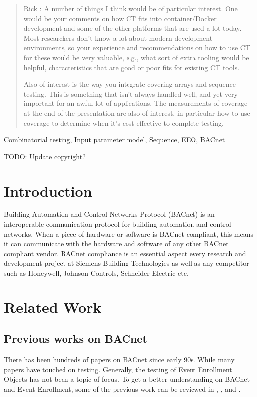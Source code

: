 \documentclass[conference]{IEEEtran}
\newcommand{\todo}[1]{}
\renewcommand{\todo}[1]{{\color{red} TODO: {#1}}}
\begin{document}
\begin{abstract}
Rick : A number of things I think would be of particular interest. 
One would be your comments on how CT fits into container/Docker development and some of the other platforms that are used a lot today. 
Most researchers don’t know a lot about modern development environments, so your experience and recommendations on how to use CT for these would be very valuable, e.g., what sort of extra tooling would be helpful, characteristics that are good or poor fits for existing CT tools.

Also of interest is the way you integrate covering arrays and sequence testing.
This is something that isn’t always handled well, and yet very important for an awful lot of applications.
The measurements of coverage at the end of the presentation are also of interest,
in particular how to use coverage to determine when it’s cost effective to complete testing. 



\end{abstract}



\begin{IEEEkeywords}
Combinatorial testing, Input parameter model, Sequence, EEO, BACnet
\end{IEEEkeywords}



\todo{Update copyright?}


\section{Introduction}
Building Automation and Control Networks Protocol (BACnet) is an interoperable communication
protocol for building automation and control networks. When a piece of hardware or software is BACnet compliant,
this means it can communicate with the hardware and software of any other BACnet compliant vendor.
BACnet compliance is an essential aspect every research and development
project at Siemens Building Technologies as well as any competitor such as Honeywell, Johnson Controls,
Schneider Electric etc.




\section{Related Work}

	\subsection{Previous works on BACnet}
	There has been hundreds of papers on BACnet since early 90s. 
	While many papers have touched on testing. Generally, the testing of Event Enrollment Objects has not been a topic of focus.
	To get a better understanding on BACnet and Event Enrollment, some of the previous work can be reviewed in \cite{bushby1997bacnettm}, \cite{bushby2002bacnet}, \cite{nussbaumerbacnet} and \cite{newman2015bacnet}. 
					
\end{document}
